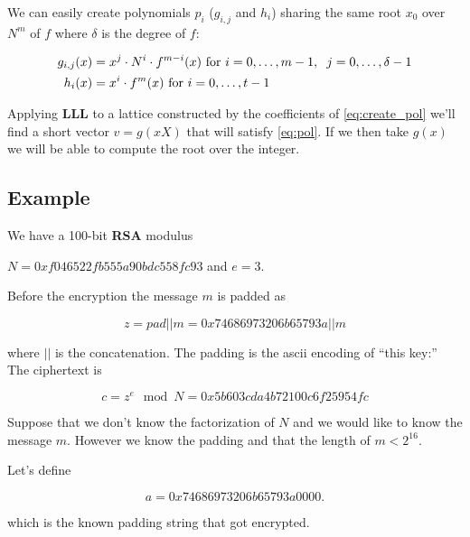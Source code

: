 \documentclass[a4paper,12pt]{report}
\begin{document}
We can easily create polynomials $p_i$ ($g_{i,j}$ and $h_i$)  sharing the same root $x_0$ over $N^m$ of $f$ where $\delta$ is the degree of $f$:

\begin{center}
    \begin{eqnarray}
        g_{i,j}(x) &= x^j \cdot N^i \cdot f^{m-i}(x) \text{ for } i = 0,\hdots,m-1,\hspace{2mm} j=0,\hdots,\delta-1 \label{eq:create_pol} \\
        h_i(x) &= x^i \cdot f^m(x) \text{ for } i = 0,\hdots,t-1 
    \end{eqnarray}
\end{center}

Applying \textbf{LLL} to a lattice constructed by the coefficients of \ref{eq:create_pol} we'll find a short vector $v = g(xX)$ that will
satisfy \ref{eq:pol}. If we then take $g(x)$ we will be able to compute the root over the integer.

\subsection{Example}

We have a 100-bit \textbf{RSA} modulus

\begin{center}
    $N=0xf046522fb555a90bdc558fc93$ and $e = 3$.
\end{center}

Before the encryption the message $m$ is padded as

\[
    z = pad || m = 0x74686973206b65793a || m
\]

where $||$ is the concatenation. The padding is the ascii encoding of ``this key:''\\

The ciphertext is

\[
    c = z^e \mod N = 0x5b603cda4b72100c6f25954fc
\]

Suppose that we don't know the factorization of $N$ and we would like to know the message $m$.
However we know the padding and that the length of $m < 2^{16}$.

\vspace*{10px}

Let's define

\[
a = 0x74686973206b65793a0000
.\] 

which is the known padding string that got encrypted.

\vspace*{10px}
\end{document}
